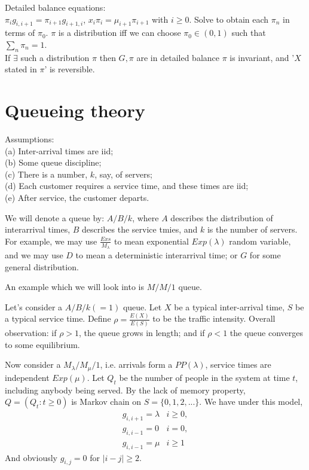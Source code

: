 \documentclass[a4paper]{article}
\begin{document}
Detailed balance equations:\\
$\pi_i g_{i,i+1} = \pi_{i+1} g_{i+1,i}$, $x_i \pi_i = \mu_{i+1} \pi_{i+1}$ with $i \geq 0$. Solve to obtain each $\pi_n$ in terms of $\pi_0$. $\pi$ is a distribution iff we can choose $\pi_0 \in (0,1)$ such that $\sum_n \pi_n = 1$.\\
If $\exists$ such a distribution $\pi$ then $G,\pi$ are in detailed balance $\pi$ is invariant, and '$X$ stated in $\pi$' is reversible.

\newpage

\section{Queueing theory}
Assumptions:\\
(a) Inter-arrival times are iid;\\
(b) Some queue discipline;\\
(c) There is a number, $k$, say, of servers;\\
(d) Each customer requires a service time, and these times are iid;\\
(e) After service, the customer departs.

We will denote a queue by: $A/B/k$, where $A$ describes the distribution of interarrival times, $B$ describes the service tmies, and $k$ is the number of servers. For example, we may use $\frac{Exs}{M_\lambda}$ to mean exponential $Exp(\lambda)$ random variable, and we may use $D$ to mean a deterministic interarrival time; or $G$ for some general distribution.

An example which we will look into is $M/M/1$ queue.

Let's consider a  $A/B/k(=1)$ queue. Let $X$ be a typical inter-arrival time, $S$ be a typical service time. Define $\rho = \frac{E(X)}{E(S)}$ to be the traffic intensity. Overall observation: if $\rho > 1$, the queue grows in length; and if $\rho < 1$ the queue converges to some equilibrium.

Now consider a $M_\lambda/M_\mu/1$, i.e. arrivals form a $PP(\lambda)$, service times are independent $Exp(\mu)$. Let $Q_t$ be the number of people in the system at time $t$, including anybody being served. By the lack of memory property, $Q = (Q_t:t \geq 0)$ is Markov chain on $S = \{0,1,2,...\}$. We have under this model,
\begin{equation*}
\begin{aligned}
g_{i,i+1} = \lambda & i \geq 0,\\
g_{i,i-1} = 0 & i = 0,\\
g_{i,i-1} = \mu & i \geq 1
\end{aligned}
\end{equation*}
And obviously $g_{i,j} = 0$ for $|i-j| \geq 2$.
\end{document}
